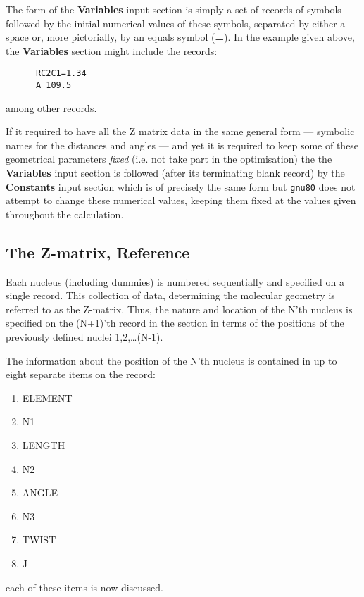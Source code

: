 The form of the {\bf Variables} input section is simply a set of
records of symbols followed by the initial numerical values of these
symbols, separated by either a space or, more pictorially, by an equals
symbol ({\bf =}). In the example given above, the {\bf Variables} section 
might include the records:
\begin{verbatim}
      RC2C1=1.34
      A 109.5
\end{verbatim}
among other records.

If it required to have all the Z matrix data in the same general form ---
symbolic names for the distances and angles --- and yet it is required
to keep some of these geometrical parameters {\em fixed} (i.e. not
take part in the optimisation) the the {\bf Variables} input section
is followed (after its terminating blank record) by the
{\bf Constants} input section which is of precisely the same form but
{\tt gnu80} does not attempt to change these numerical values, keeping them
fixed at the values given throughout the calculation.
\subsection{\sf The Z-matrix, Reference}
Each nucleus (including dummies) is numbered sequentially and
specified on a single record. 
This collection of data, determining the
molecular geometry is referred to as the Z-matrix.
Thus, the nature and location of the N'th nucleus is specified on the
(N+1)'th record in the section in terms of the positions of the previously
defined nuclei 1,2,\ldots (N-1).

The information about the position of the N'th 
nucleus is contained in up to eight
separate items on the record:
\begin{enumerate}
\item ELEMENT
\item N1
\item LENGTH
\item N2
\item ANGLE
\item N3
\item TWIST
\item J
\end{enumerate}
each of these items is now discussed.


